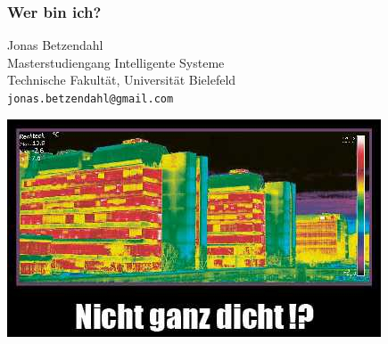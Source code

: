 \documentclass[aspectratio=43]{beamer}
\begin{document}

\begin{frame}
\frametitle{Wer bin ich?}

Jonas Betzendahl\\
Masterstudiengang \glqq Intelligente Systeme\grqq\\
Technische Fakultät, Universität Bielefeld\\
\texttt{jonas.betzendahl@gmail.com}
\smallskip\smallskip

\begin{center}
\includegraphics[scale=0.5]{images/thermopostkarte.jpg} 
\end{center}
\end{frame}

\end{document}
